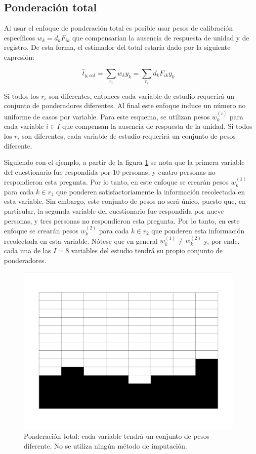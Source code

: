\documentclass[
  12pt,
]{book}
\begin{document}
\hypertarget{ponderaciuxf3n-total}{%
\subsection{Ponderación total}\label{ponderaciuxf3n-total}}

Al usar el enfoque de ponderación total es posible usar pesos de calibración específicos \(w_k = d_k F_{ik}\) que compensarían la ausencia de respuesta de unidad y de registro. De esta forma, el estimador del total estaría dado por la siguiente expresión:

\[
\hat{t}_{y,cal} =\sum_{r_i}w_ky_k = 
\sum_{r_i}d_k F_{ik} y_k
\]

Si todos los \(r_i\) son diferentes, entonces cada variable de estudio requerirá un conjunto de ponderadores diferentes. Al final este enfoque induce un número no uniforme de casos por variable. Para este esquema, se utilizan pesos \(w_k^{(i)}\) para cada variable \(i \in I\) que compensan la ausencia de respuesta de la unidad. Si todos los \(r_i\) son diferentes, cada variable de estudio requerirá un conjunto de pesos diferente.

Siguiendo con el ejemplo, a partir de la figura \ref{fig:figpondtotal} se nota que la primera variable del cuestionario fue respondida por 10 personas, y cuatro personas no respondieron esta pregunta. Por lo tanto, en este enfoque se crearán pesos \(w_k^{(1)}\) para cada \(k\in r_1\) que ponderen satisfactoriamente la información recolectada en esta variable. Sin embargo, este conjunto de pesos no será único, puesto que, en particular, la segunda variable del cuestionario fue respondida por nueve personas, y tres personas no respondieron esta pregunta. Por lo tanto, en este enfoque se crearán pesos \(w_k^{(2)}\) para cada \(k\in r_2\) que ponderen esta información recolectada en esta variable. Nótese que en general \(w_k^{(1)} \neq w_k^{(2)}\) y, por ende, cada una de las \(I=8\) variables del estudio tendrá su propio conjunto de ponderadores.

\begin{figure}
\includegraphics[width=0.5\linewidth]{Pics/j4} \caption{Ponderación total: cada variable tendrá un conjunto de pesos diferente. No se utiliza ningún método de imputación.}\label{fig:figpondtotal}
\end{figure}
\end{document}
